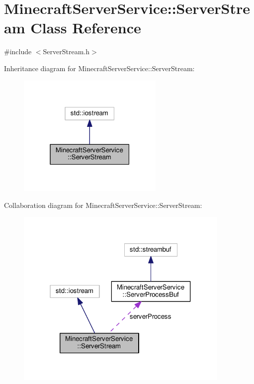\hypertarget{class_minecraft_server_service_1_1_server_stream}{}\section{Minecraft\+Server\+Service\+:\+:Server\+Stream Class Reference}
\label{class_minecraft_server_service_1_1_server_stream}


{\ttfamily \#include $<$Server\+Stream.\+h$>$}



Inheritance diagram for Minecraft\+Server\+Service\+:\+:Server\+Stream\+:\nopagebreak
\begin{figure}[H]
\begin{center}
\leavevmode
\includegraphics[width=199pt]{class_minecraft_server_service_1_1_server_stream__inherit__graph}
\end{center}
\end{figure}


Collaboration diagram for Minecraft\+Server\+Service\+:\+:Server\+Stream\+:\nopagebreak
\begin{figure}[H]
\begin{center}
\leavevmode
\includegraphics[width=292pt]{class_minecraft_server_service_1_1_server_stream__coll__graph}
\end{center}
\end{figure}
